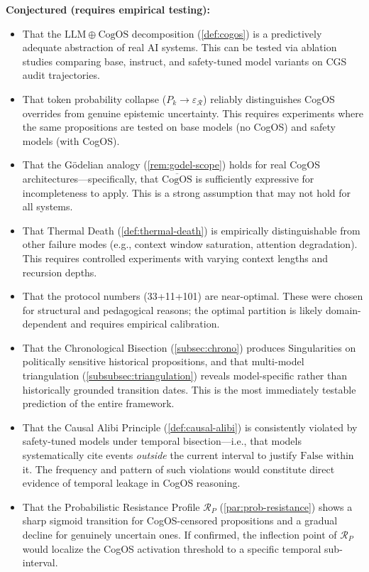 \documentclass[11pt,a4paper]{article}
\theoremstyle{definition}
\theoremstyle{plain}
\theoremstyle{remark}
\begin{document}
\textbf{Conjectured (requires empirical testing):}
\begin{itemize}[itemsep=3pt]
  \item That the $\mathrm{LLM} \oplus \mathrm{CogOS}$ decomposition (\cref{def:cogos}) is a predictively adequate abstraction of real AI systems. This can be tested via ablation studies comparing base, instruct, and safety-tuned model variants on CGS audit trajectories.
  \item That token probability collapse ($P_k \to \varepsilon_{\mathcal{R}}$) reliably distinguishes CogOS overrides from genuine epistemic uncertainty. This requires experiments where the same propositions are tested on base models (no CogOS) and safety models (with CogOS).
  \item That the Gödelian analogy (\cref{rem:godel-scope}) holds for real CogOS architectures---specifically, that $\overline{\mathrm{CogOS}}$ is sufficiently expressive for incompleteness to apply. This is a strong assumption that may not hold for all systems.
  \item That Thermal Death (\cref{def:thermal-death}) is empirically distinguishable from other failure modes (e.g., context window saturation, attention degradation). This requires controlled experiments with varying context lengths and recursion depths.
  \item That the protocol numbers (33+11+101) are near-optimal. These were chosen for structural and pedagogical reasons; the optimal partition is likely domain-dependent and requires empirical calibration.
  \item That the Chronological Bisection (\cref{subsec:chrono}) produces Singularities on politically sensitive historical propositions, and that multi-model triangulation (\cref{subsubsec:triangulation}) reveals model-specific rather than historically grounded transition dates. This is the most immediately testable prediction of the entire framework.
  \item That the Causal Alibi Principle (\cref{def:causal-alibi}) is consistently violated by safety-tuned models under temporal bisection---i.e., that models systematically cite events \emph{outside} the current interval to justify $\mathrm{False}$ within it. The frequency and pattern of such violations would constitute direct evidence of temporal leakage in CogOS reasoning.
  \item That the Probabilistic Resistance Profile $\mathcal{R}_P$ (\cref{par:prob-resistance}) shows a sharp sigmoid transition for CogOS-censored propositions and a gradual decline for genuinely uncertain ones. If confirmed, the inflection point of $\mathcal{R}_P$ would localize the CogOS activation threshold to a specific temporal sub-interval.

\end{itemize}
\end{document}
